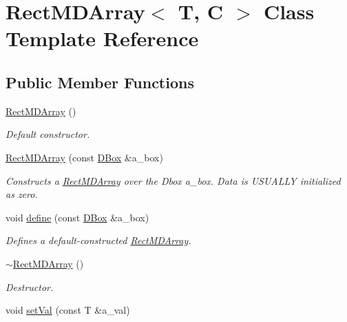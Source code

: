 \hypertarget{class_rect_m_d_array}{}\section{Rect\+M\+D\+Array$<$ T, C $>$ Class Template Reference}
\label{class_rect_m_d_array}
\subsection*{Public Member Functions}
\begin{DoxyCompactItemize}
\item 
\mbox{\label{class_rect_m_d_array_a03438c475f5d63c8322652c1ebe0da4b}} 
\hyperlink{class_rect_m_d_array_a03438c475f5d63c8322652c1ebe0da4b}{Rect\+M\+D\+Array} ()
\begin{DoxyCompactList}\small\item\em Default constructor. \end{DoxyCompactList}\item 
\hyperlink{class_rect_m_d_array_ab35dbe45e315471e0fc10002b17e728d}{Rect\+M\+D\+Array} (const \hyperlink{class_d_box}{D\+Box} \&a\+\_\+box)
\begin{DoxyCompactList}\small\item\em Constructs a \hyperlink{class_rect_m_d_array}{Rect\+M\+D\+Array} over the Dbox a\+\_\+box. Data is U\+S\+U\+A\+L\+LY initialized as zero. \end{DoxyCompactList}\item 
void \hyperlink{class_rect_m_d_array_a7d77761067bd63046fcb07e485d91954}{define} (const \hyperlink{class_d_box}{D\+Box} \&a\+\_\+box)
\begin{DoxyCompactList}\small\item\em Defines a default-\/constructed \hyperlink{class_rect_m_d_array}{Rect\+M\+D\+Array}. \end{DoxyCompactList}\item 
\mbox{\label{class_rect_m_d_array_a9966ff4fa894c7cf11a2c319b656403c}} 
\hyperlink{class_rect_m_d_array_a9966ff4fa894c7cf11a2c319b656403c}{$\sim$\+Rect\+M\+D\+Array} ()
\begin{DoxyCompactList}\small\item\em Destructor. \end{DoxyCompactList}\item 
void \hyperlink{class_rect_m_d_array_af84b04d2561605c230fef402b5df530e}{set\+Val} (const T \&a\+\_\+val)

\end{DoxyCompactItemize}
